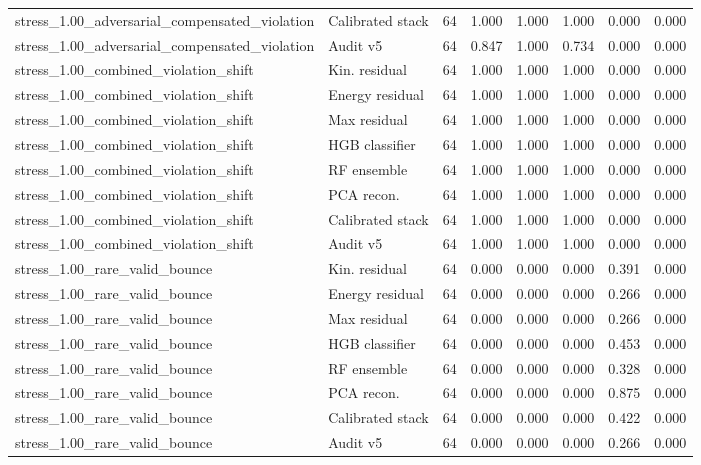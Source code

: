 {\begin{longtable}{llrrrrrr}
stress\_1.00\_adversarial\_compensated\_violation & Calibrated stack & 64 & 1.000 & 1.000 & 1.000 & 0.000 & 0.000 \\
stress\_1.00\_adversarial\_compensated\_violation & Audit v5 & 64 & 0.847 & 1.000 & 0.734 & 0.000 & 0.000 \\
stress\_1.00\_combined\_violation\_shift & Kin. residual & 64 & 1.000 & 1.000 & 1.000 & 0.000 & 0.000 \\
stress\_1.00\_combined\_violation\_shift & Energy residual & 64 & 1.000 & 1.000 & 1.000 & 0.000 & 0.000 \\
stress\_1.00\_combined\_violation\_shift & Max residual & 64 & 1.000 & 1.000 & 1.000 & 0.000 & 0.000 \\
stress\_1.00\_combined\_violation\_shift & HGB classifier & 64 & 1.000 & 1.000 & 1.000 & 0.000 & 0.000 \\
stress\_1.00\_combined\_violation\_shift & RF ensemble & 64 & 1.000 & 1.000 & 1.000 & 0.000 & 0.000 \\
stress\_1.00\_combined\_violation\_shift & PCA recon. & 64 & 1.000 & 1.000 & 1.000 & 0.000 & 0.000 \\
stress\_1.00\_combined\_violation\_shift & Calibrated stack & 64 & 1.000 & 1.000 & 1.000 & 0.000 & 0.000 \\
stress\_1.00\_combined\_violation\_shift & Audit v5 & 64 & 1.000 & 1.000 & 1.000 & 0.000 & 0.000 \\
stress\_1.00\_rare\_valid\_bounce & Kin. residual & 64 & 0.000 & 0.000 & 0.000 & 0.391 & 0.000 \\
stress\_1.00\_rare\_valid\_bounce & Energy residual & 64 & 0.000 & 0.000 & 0.000 & 0.266 & 0.000 \\
stress\_1.00\_rare\_valid\_bounce & Max residual & 64 & 0.000 & 0.000 & 0.000 & 0.266 & 0.000 \\
stress\_1.00\_rare\_valid\_bounce & HGB classifier & 64 & 0.000 & 0.000 & 0.000 & 0.453 & 0.000 \\
stress\_1.00\_rare\_valid\_bounce & RF ensemble & 64 & 0.000 & 0.000 & 0.000 & 0.328 & 0.000 \\
stress\_1.00\_rare\_valid\_bounce & PCA recon. & 64 & 0.000 & 0.000 & 0.000 & 0.875 & 0.000 \\
stress\_1.00\_rare\_valid\_bounce & Calibrated stack & 64 & 0.000 & 0.000 & 0.000 & 0.422 & 0.000 \\
stress\_1.00\_rare\_valid\_bounce & Audit v5 & 64 & 0.000 & 0.000 & 0.000 & 0.266 & 0.000 \\
\bottomrule
\end{longtable}
}
